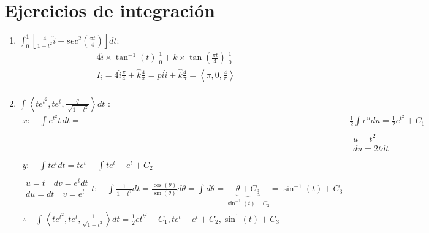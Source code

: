 \section{Ejercicios de integración}
\begin{enumerate}
    \item $\int_{0}^{1}\left[\frac{4}{1+t^2}\hat{i} + sec^2(\frac{\pi t}{4} )\right] dt$:
        \begin{align*}
            4 \hat{i} \times \tan^{-1}(t) \Big|_0^1 + \hat{k} \times \tan(\frac{\pi t}{4} ) \Big|_{0}^{1} \\ 
            I_i = 4 \hat{i}  \frac{\pi}{4} + \hat{k} \frac{4}{\pi } = pi \hat{i} + \hat{k} \frac{4}{\pi } = \left\langle \pi,0,\frac{4}{\pi } \right\rangle \\ 
        \end{align*}
    
    \item $\int_{}^{}\left\langle te^{t^2},te^t,\frac{q}{\sqrt[]{1-t^2}} \right\rangle dt$ :
        \begin{align*}
            x: \quad \int_{}^{}e^{t^2}t\,dt =& \frac{1}{2} \int_{}^{}e^{u}du = \frac{1}{2} e^{t^2} +C_1 \\ 
                &\begin{matrix}
                    u = t^2 \\ 
                    du = 2tdt \\ 
                \end{matrix} \\ 
            y: \quad \int_{}^{} te^{t} dt = te^{t} - \int_{}^{} te^t-e^t+C_2 \\ 
                \begin{matrix}
                    u = t \quad dv = e^t dt \\ 
                    du = dt \quad v = e^t \\ 
                \end{matrix}
            t: \quad \int_{}^{}\frac{1}{1-t^2} dt = \frac{\cos(\theta)}{\sin(\theta)}d\theta = \int_{}^{} d\theta = \underbrace{\theta + C_3}_{\sin^{-1}(t)+C_3} = \sin^{-1}(t)+C_3 \\
            \therefore \quad \int_{}^{} \left\langle te^{t^2},te^t,\frac{1}{\sqrt{1-t^2}} \right\rangle dt = \frac{1}{2} et^{t^2}+C_1,te^t-e^t+C_2,\sin^1(t) + C_3 \\  
        \end{align*}
\end{enumerate}


